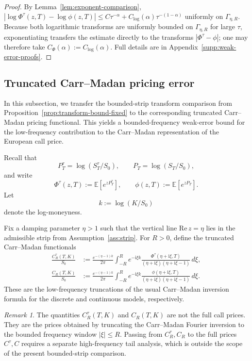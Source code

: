 \documentclass[letterpaper]{article}
\numberwithin{equation}{section}
\theoremstyle{definition}
\theoremstyle{remark}
\newtheorem{remark}[theorem]{Remark}
\newcommand{\E}{\mathbb{E}}
\newcommand{\ii}{\mathrm{i}}
\begin{document}
\begin{proof}
{By Lemma~\ref{lem:exponent-comparison},
$|\log\Phi^\tau(z,T)-\log\phi(z,T)|\le C\tau^{-\alpha}+C_{\log}(\alpha)\tau^{-(1-\alpha)}$
uniformly on $\Gamma_{\eta,R}$. Because both logarithmic transforms are
uniformly bounded on $\Gamma_{\eta,R}$ for large $\tau$, exponentiating
transfers the estimate directly to the transforms $|\Phi^\tau-\phi|$; one may
therefore take $C_{\Phi}(\alpha):=C_{\log}(\alpha)$.} Full
details are in Appendix~\ref{supp:weak-error-proofs}.
\end{proof}


\subsection{Truncated Carr--Madan pricing error}
\label{subsec:pricing-error}

In this subsection, we transfer the bounded-strip transform comparison from
Proposition~\ref{prop:transform-bound-fixed} to the corresponding truncated
Carr--Madan pricing functional. This yields a bounded-frequency weak-error bound
for the low-frequency contribution to the Carr--Madan representation of the
European call price.

Recall that
\[
  P_T^\tau=\log(S_T^\tau/S_0),
  \qquad
  P_T=\log(S_T/S_0),
\]
and write
\[
  \Phi^\tau(z,T):=\E\left[e^{zP_T^\tau}\right],
  \qquad
  \phi(z,T):=\E\left[e^{zP_T}\right].
\]
Let
\[
  k:=\log(K/S_0)
\]
denote the log-moneyness.

Fix a damping parameter $\eta>1$ such that the vertical line
$\mathrm{Re}\,z=\eta$ lies in the admissible strip from
Assumption~\ref{ass:strip}. For $R>0$, define the truncated Carr--Madan
functionals
\begin{align}
  \frac{C_R^\tau(T,K)}{S_0}
  &:=
  \frac{e^{-(\eta-1)k}}{2\pi}
  \int_{-R}^{R}
    e^{-\ii \xi k}
    \frac{\Phi^\tau(\eta+\ii \xi,T)}
         {(\eta+\ii \xi)(\eta+\ii \xi-1)}
  \,d\xi,
  \label{eq:CRtau-def-trunc}
  \\
  \frac{C_R(T,K)}{S_0}
  &:=
  \frac{e^{-(\eta-1)k}}{2\pi}
  \int_{-R}^{R}
    e^{-\ii \xi k}
    \frac{\phi(\eta+\ii \xi,T)}
         {(\eta+\ii \xi)(\eta+\ii \xi-1)}
  \,d\xi.
  \label{eq:CR-def-trunc}
\end{align}
These are the low-frequency truncations of the usual Carr--Madan inversion
formula for the discrete and continuous models, respectively.

\begin{remark}
The quantities $C_R^\tau(T,K)$ and $C_R(T,K)$ are not the full call prices.
They are the prices obtained by truncating the Carr--Madan Fourier inversion to
the bounded frequency window $|\xi|\le R$. Passing from $C_R^\tau,C_R$ to the
full prices $C^\tau,C$ requires a separate high-frequency tail analysis, which
is outside the scope of the present bounded-strip comparison.
\end{remark}
\end{document}
